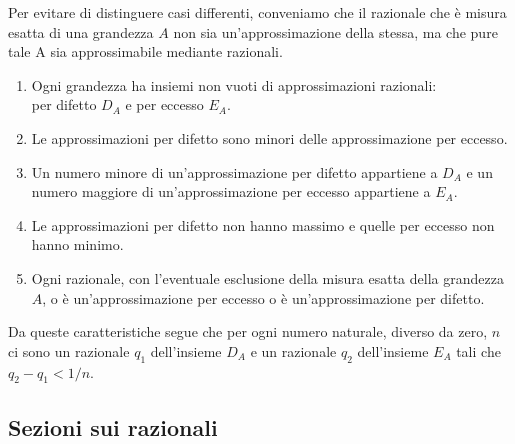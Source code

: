 
\begin{osservazione}
Per evitare di distinguere casi differenti, conveniamo che il razionale che 
è misura esatta di una grandezza \(A\) non sia un'approssimazione della 
stessa, ma che pure tale A sia approssimabile mediante razionali.
\begin{enumerate} [noitemsep]
\item 
Ogni grandezza ha insiemi non vuoti di approssimazioni razionali: \\
per difetto \(D_A\) e per eccesso \(E_A\). 
\item 
Le approssimazioni per difetto sono minori delle approssimazione per eccesso.
\item 
Un numero minore di un'approssimazione per difetto appartiene a \(D_A\) e un 
numero maggiore di un'approssimazione per eccesso appartiene a \(E_A\).
\item 
Le approssimazioni per difetto non hanno massimo e quelle per eccesso non 
hanno minimo.
\item 
Ogni razionale, con l'eventuale esclusione della misura esatta della 
grandezza \(A\), o è un'approssimazione per eccesso o è un'approssimazione 
per difetto.
\end{enumerate}
Da queste caratteristiche segue che per ogni numero naturale, diverso da 
zero, \(n\) ci sono un razionale \(q_1\) dell'insieme \(D_A\) e un razionale 
\(q_2\) dell'insieme \(E_A\) tali che \(q_2-q_1 < 1/n\).
\end{osservazione}

\subsection{Sezioni sui razionali}

